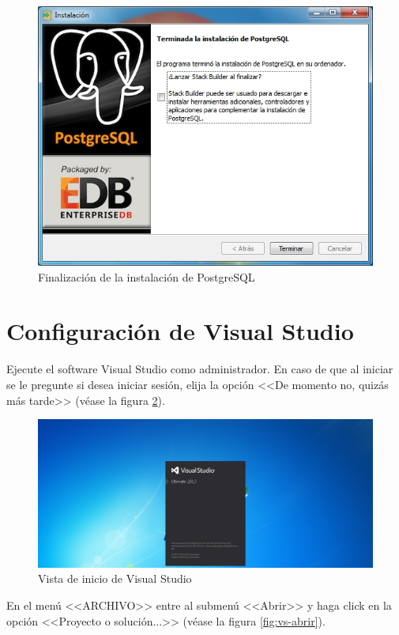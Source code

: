 \begin{figure}[H]
  \centering
  \includegraphics[width=.8\linewidth]{./img/postgres9.jpg}
\caption[Finalizaci\'{o}n de la instalaci\'{o}n de PostgreSQL]{Finalizaci\'{o}n de la instalaci\'{o}n de PostgreSQL\label{fig:vs-instalacion9}}
\end{figure}

\newpage

\section{Configuraci\'{o}n de Visual Studio}
	
	Ejecute el software Visual Studio como administrador. En caso de que al iniciar se le pregunte si desea iniciar sesi\'{o}n, elija la opci\'{o}n <<De momento no, quiz\'{a}s m\'{a}s tarde>> (v\'{e}ase la figura \ref{fig:vs-inicio}).	

\begin{figure}[H]
  \centering
  \includegraphics[width=.8\linewidth]{./img/vs-inicio.jpg}
\caption[Vista de inicio de Visual Studio]{Vista de inicio de Visual Studio\label{fig:vs-inicio}}
\end{figure}

En el men\'{u} <<ARCHIVO>> entre al submen\'{u} <<Abrir>> y haga click en la opci\'{o}n <<Proyecto o soluci\'{o}n...>> (v\'{e}ase la figura \ref{fig:vs-abrir}).	

